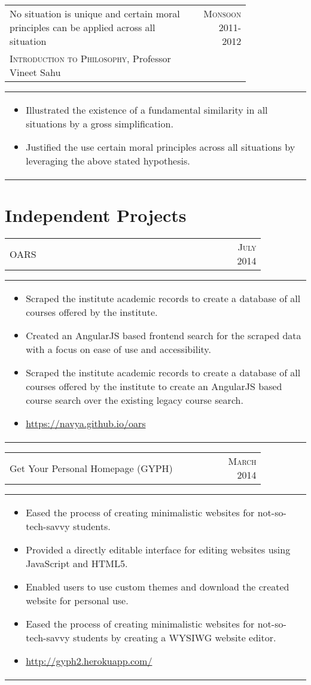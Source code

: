\documentclass[a4paper,10pt]{article} %
\newcommand{\lproject}[4]{
    \begin{tabular}{p{0.80\linewidth}r}
        \textcolor{NavyBlue}{#2} & \multicolumn{1}{m{4cm}}{\raggedleft \textsc{#1}}\\
        #3
    \end{tabular}
    \begin{tabular}{p{\linewidth}}
    \vspace{-0.3cm}
        \footnotesize{#4}
    \end{tabular}
    \vspace{-0.5cm}
}
\newcommand{\iproject}[3]{
    \begin{tabular}{p{0.85\linewidth}r}
        \textcolor{NavyBlue}{#2} & \multicolumn{1}{m{3cm}}{\raggedleft \textsc{#1}}\\
    \end{tabular}
    \begin{tabular}{p{\linewidth}}
    \vspace{-0.3cm}
        \footnotesize{#3}
    \end{tabular}
    \vspace{-0.5cm}
}
\begin{document}
\lproject {Monsoon 2011-2012}
          {No situation is unique and certain moral principles can be applied across all situation}
          {\textsc{Introduction to Philosophy}, Professor Vineet Sahu}
          {
               \begin{itemize}[leftmargin=0.5cm]
                   \item Illustrated the existence of a fundamental similarity in all situations by a gross simplification.
                   \item Justified the use certain moral principles across all situations by leveraging the above stated hypothesis.
               \end{itemize}
           }

\section{Independent Projects}

\iproject {July 2014}
          {OARS}
          {
               \begin{itemize}[leftmargin=0.5cm]
                   \item Scraped the institute academic records to create a database of all courses offered by the institute.
                   \item Created an AngularJS based frontend search for the scraped data with a focus on ease of use and accessibility.
                   \item Scraped the institute academic records to create a database of all courses offered by the institute to create an
                       AngularJS based course search over the existing legacy course search.
                   \item \href{https://navya.github.io/oars}{https://navya.github.io/oars}
               \end{itemize}
           }

\iproject {March 2014}
          {Get Your Personal Homepage (GYPH)}
          {
               \begin{itemize}[leftmargin=0.5cm]
                   \item Eased the process of creating minimalistic websites for not-so-tech-savvy students.
                   \item Provided a directly editable interface for editing websites using JavaScript and HTML5.
                   \item Enabled users to use custom themes and download the created website for personal use.
                   \item Eased the process of creating minimalistic websites for not-so-tech-savvy students by creating a WYSIWG website
                       editor.
                   \item \href{http://gyph2.herokuapp.com/} {http://gyph2.herokuapp.com/}
               \end{itemize}
           }
\end{document}
